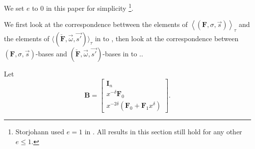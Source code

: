 {} We set $e$ to $0$ in this paper for simplicity%
\footnote{Storjohann used $e=1$ in \citep{Storjohann:2006}. All results in
this section still hold for any other $e\le1.$%
}. %
\begin{comment}
In fact, it is quite easy to construct a $(\check{\mathbf{F}},\vec{\omega},\vec{s'})$-basis
from a $\left(\mathbf{F},\sigma,\vec{s}\right)$-basis, as we show
later in \prettyref{lem:FtoAbasis}. However, it requires more work
to extract a $\left(\mathbf{F},\sigma,\vec{s}\right)$-basis from
a $(\check{\mathbf{F}},\vec{\omega},\vec{s'})$-basis, which is addressed
eventually in \prettyref{cor:extractingFbasisFromGbasis}. Note that
although constructing a $(\check{\mathbf{F}},\vec{\omega},\vec{s'})$-basis
from a $\left(\mathbf{F},\sigma,\vec{s}\right)$-basis in \prettyref{lem:FtoAbasis}
is the reverse of what we want, this well-formed $(\check{\mathbf{F}},\vec{\omega},\vec{s'})$-basis
restricts the elements of $\langle(\check{\mathbf{F}},\vec{\omega},\vec{s'})\rangle$
to a simple form shown in \prettyref{cor:FtauBasisForm}, which helps
to establish a close correspondence between a $(\check{\mathbf{F}},\vec{\omega},\vec{s'})$-basis
and a $\left(\mathbf{F},\sigma,\vec{s}\right)$-basis in \prettyref{lem:2delta-1Basis},
\prettyref{lem:2deltaBasis}, and \prettyref{thm:mainTheorem}.
\end{comment}
{}

We first look at the correspondence bettween the elements of $\left\langle \left(\mathbf{F},\sigma,\vec{s}\right)\right\rangle _{\tau}$
and the elements of $\langle(\check{\mathbf{F}},\vec{\omega},\vec{s'})\rangle_{\tau}$
in  to , then
look at the correspondence between $\left(\mathbf{F},\sigma,\vec{s}\right)$-bases
and $(\check{\mathbf{F}},\vec{\omega},\vec{s'})$-bases in 
to .. 

Let \[
\mathbf{B}=\left[\begin{array}{c}
\mathbf{I}_{n}\\
x^{-\delta}\mathbf{F}_{0}\\
x^{-2\delta}\left(\mathbf{F}_{0}+\mathbf{F}_{1}x^{\delta}\right)\end{array}\right].\]

